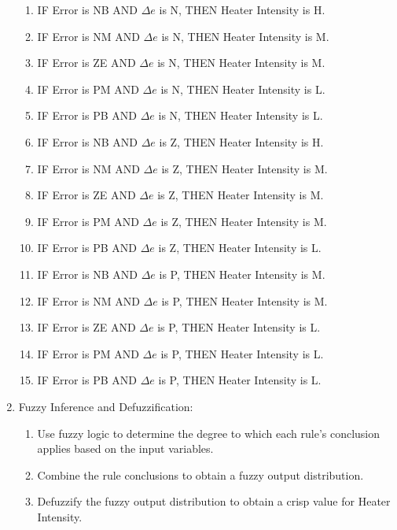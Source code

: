 \documentclass[12pt,a4paper, brazil]{article}
\begin{document}
\begin{enumerate}
\begin{enumerate}
\item IF Error is NB AND $\Delta e$ is N, THEN Heater Intensity is H.
\item IF Error is NM AND $\Delta e$ is N, THEN Heater Intensity is M.
\item IF Error is ZE AND $\Delta e$ is N, THEN Heater Intensity is M.
\item IF Error is PM AND $\Delta e$ is N, THEN Heater Intensity is L.
\item IF Error is PB AND $\Delta e$ is N, THEN Heater Intensity is L.
\item IF Error is NB AND $\Delta e$ is Z, THEN Heater Intensity is H.
\item IF Error is NM AND $\Delta e$ is Z, THEN Heater Intensity is M.
\item IF Error is ZE AND $\Delta e$ is Z, THEN Heater Intensity is M.
\item IF Error is PM AND $\Delta e$ is Z, THEN Heater Intensity is M.
\item IF Error is PB AND $\Delta e$ is Z, THEN Heater Intensity is L.
\item IF Error is NB AND $\Delta e$ is P, THEN Heater Intensity is M.
\item IF Error is NM AND $\Delta e$ is P, THEN Heater Intensity is M.
\item IF Error is ZE AND $\Delta e$ is P, THEN Heater Intensity is L.
\item IF Error is PM AND $\Delta e$ is P, THEN Heater Intensity is L.
\item IF Error is PB AND $\Delta e$ is P, THEN Heater Intensity is L.
\end{enumerate}

\item Fuzzy Inference and Defuzzification:

\begin{enumerate}
  \item Use fuzzy logic to determine the degree to which each rule's conclusion applies based on the input variables.
  \item Combine the rule conclusions to obtain a fuzzy output distribution.
  \item Defuzzify the fuzzy output distribution to obtain a crisp value for Heater Intensity.
\end{enumerate}


\end{enumerate}

\printbibliography
\end{document}
